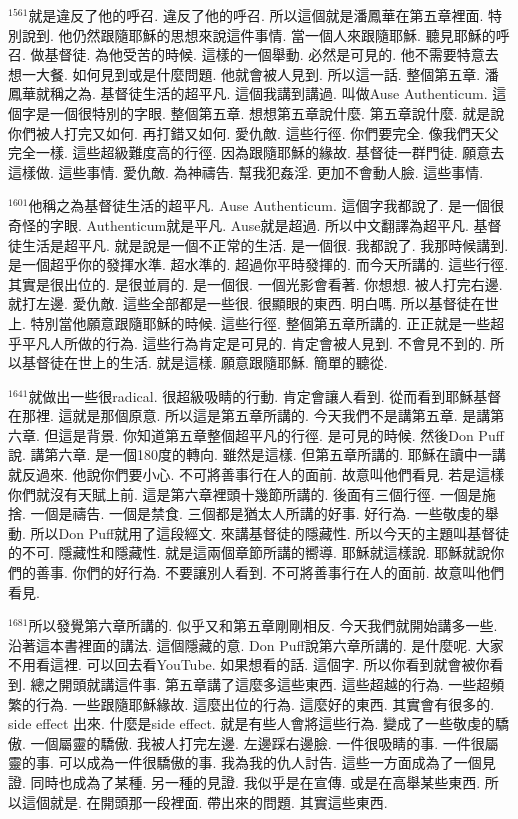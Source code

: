 \documentclass{book}
\begin{document}
$^{1561}$就是違反了他的呼召.
違反了他的呼召.
所以這個就是潘鳳華在第五章裡面.
特別說到.
他仍然跟隨耶穌的思想來說這件事情.
當一個人來跟隨耶穌.
聽見耶穌的呼召.
做基督徒.
為他受苦的時候.
這樣的一個舉動.
必然是可見的.
他不需要特意去想一大餐.
如何見到或是什麼問題.
他就會被人見到.
所以這一話.
整個第五章.
潘鳳華就稱之為.
基督徒生活的超平凡.
這個我講到講過.
叫做Ause Authenticum.
這個字是一個很特別的字眼.
整個第五章.
想想第五章說什麼.
第五章說什麼.
就是說你們被人打完又如何.
再打錯又如何.
愛仇敵.
這些行徑.
你們要完全.
像我們天父完全一樣.
這些超級難度高的行徑.
因為跟隨耶穌的緣故.
基督徒一群門徒.
願意去這樣做.
這些事情.
愛仇敵.
為神禱告.
幫我犯姦淫.
更加不會動人臉.
這些事情.

$^{1601}$他稱之為基督徒生活的超平凡.
Ause Authenticum.
這個字我都說了.
是一個很奇怪的字眼.
Authenticum就是平凡.
Ause就是超過.
所以中文翻譯為超平凡.
基督徒生活是超平凡.
就是說是一個不正常的生活.
是一個很.
我都說了.
我那時候講到.
是一個超乎你的發揮水準.
超水準的.
超過你平時發揮的.
而今天所講的.
這些行徑.
其實是很出位的.
是很並肩的.
是一個很.
一個光影會看著.
你想想.
被人打完右邊.
就打左邊.
愛仇敵.
這些全部都是一些很.
很顯眼的東西.
明白嗎.
所以基督徒在世上.
特別當他願意跟隨耶穌的時候.
這些行徑.
整個第五章所講的.
正正就是一些超乎平凡人所做的行為.
這些行為肯定是可見的.
肯定會被人見到.
不會見不到的.
所以基督徒在世上的生活.
就是這樣.
願意跟隨耶穌.
簡單的聽從.

$^{1641}$就做出一些很radical.
很超級吸睛的行動.
肯定會讓人看到.
從而看到耶穌基督在那裡.
這就是那個原意.
所以這是第五章所講的.
今天我們不是講第五章.
是講第六章.
但這是背景.
你知道第五章整個超平凡的行徑.
是可見的時候.
然後Don Puff說.
講第六章.
是一個180度的轉向.
雖然是這樣.
但第五章所講的.
耶穌在讀中一講就反過來.
他說你們要小心.
不可將善事行在人的面前.
故意叫他們看見.
若是這樣你們就沒有天賦上前.
這是第六章裡頭十幾節所講的.
後面有三個行徑.
一個是施捨.
一個是禱告.
一個是禁食.
三個都是猶太人所講的好事.
好行為.
一些敬虔的舉動.
所以Don Puff就用了這段經文.
來講基督徒的隱藏性.
所以今天的主題叫基督徒的不可.
隱藏性和隱藏性.
就是這兩個章節所講的嚮導.
耶穌就這樣說.
耶穌就說你們的善事.
你們的好行為.
不要讓別人看到.
不可將善事行在人的面前.
故意叫他們看見.

$^{1681}$所以發覺第六章所講的.
似乎又和第五章剛剛相反.
今天我們就開始講多一些.
沿著這本書裡面的講法.
這個隱藏的意.
Don Puff說第六章所講的.
是什麼呢.
大家不用看這裡.
可以回去看YouTube.
如果想看的話.
這個字.
所以你看到就會被你看到.
總之開頭就講這件事.
第五章講了這麼多這些東西.
這些超越的行為.
一些超頻繁的行為.
一些跟隨耶穌緣故.
這麼出位的行為.
這麼好的東西.
其實會有很多的.
side effect 出來.
什麼是side effect.
就是有些人會將這些行為.
變成了一些敬虔的驕傲.
一個屬靈的驕傲.
我被人打完左邊.
左邊踩右邊臉.
一件很吸睛的事.
一件很屬靈的事.
可以成為一件很驕傲的事.
我為我的仇人討告.
這些一方面成為了一個見證.
同時也成為了某種.
另一種的見證.
我似乎是在宣傳.
或是在高舉某些東西.
所以這個就是.
在開頭那一段裡面.
帶出來的問題.
其實這些東西.
\end{document}
